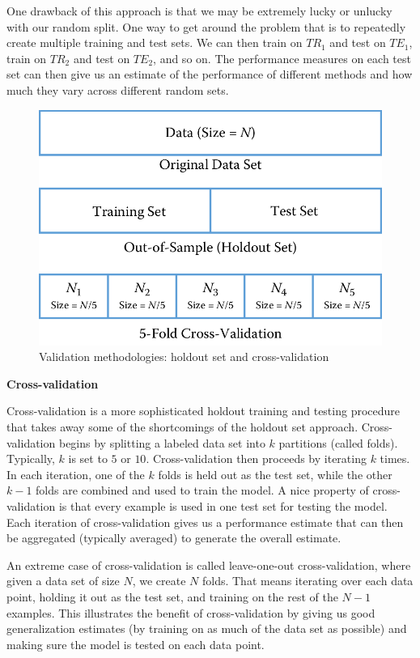 \documentclass[]{krantz}
\begin{document}
One drawback of this approach is that we may be extremely lucky or
unlucky with our random split. One way to get around the problem that is
to repeatedly create multiple training and test sets. We can then train
on \(TR_1\) and test on \(TE_1\), train on \(TR_2\) and test on
\(TE_2\), and so on. The performance measures on each test set can then
give us an estimate of the performance of different methods and how much
they vary across different random sets.

\begin{figure}

{\centering \includegraphics[width=0.7\linewidth]{ChapterML/figures/holdout} 

}

\caption{Validation methodologies: holdout set and cross-validation}\label{fig:holdout}
\end{figure}

\textbf{Cross-validation}

Cross-validation is a more sophisticated holdout training and testing
procedure that takes away some of the shortcomings of the holdout set
approach. Cross-validation begins by splitting a labeled data set into
\(k\) partitions (called folds). Typically, \(k\) is set to \(5\) or
\(10\). Cross-validation then proceeds by iterating \(k\) times. In each
iteration, one of the \(k\) folds is held out as the test set, while the
other \(k-1\) folds are combined and used to train the model. A nice
property of cross-validation is that every example is used in one test
set for testing the model. Each iteration of cross-validation gives us a
performance estimate that can then be aggregated (typically averaged) to
generate the overall estimate.

An extreme case of cross-validation is called leave-one-out
cross-validation, where given a data set of size \(N\), we create \(N\)
folds. That means iterating over each data point, holding it out as the
test set, and training on the rest of the \(N-1\) examples. This
illustrates the benefit of cross-validation by giving us good
generalization estimates (by training on as much of the data set as
possible) and making sure the model is tested on each data point.
\end{document}
